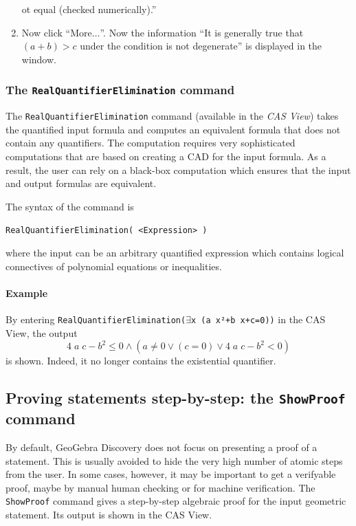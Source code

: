 \documentclass{article}
\begin{document}
\begin{enumerate}
ot equal (checked numerically).''
    \item Now click ``More$\ldots$''. Now the information ``It is generally true that $(a+b)>c$ under the condition is not degenerate'' is displayed in the window.
\end{enumerate}

\subsubsection{The \texttt{RealQuantifierElimination} command}

The \texttt{RealQuantifierElimination} command (available in the \textit{CAS View}) takes the quantified input formula and computes an equivalent formula that does not contain any quantifiers. The computation requires very sophisticated computations that are based on creating a CAD for the input formula. As a result, the user can rely on a black-box computation which ensures that the input and output formulas are equivalent.

The syntax of the command is
\begin{center}
    \texttt{RealQuantifierElimination( <Expression> )}
\end{center}
where the input can be an arbitrary quantified expression which contains logical connectives of polynomial equations or inequalities.

\paragraph{Example} By entering \texttt{RealQuantifierElimination($\exists$x (a x²+b x+c=0))} in the CAS View,
the output
\[4 \; a \; c - b^{2} \leq 0 \wedge \left(a \neq 0 \vee \left(c = 0 \right) \vee 4 \; a \; c - b^{2} < 0 \right)\]
is shown. Indeed, it no longer contains the existential quantifier.

\subsection{Proving statements step-by-step: the \texttt{ShowProof} command}

By default, GeoGebra Discovery does not focus on presenting a proof of a statement. This is usually avoided
to hide the very high number of atomic steps from the user. In some cases, however, it may be important to get a verifyable proof, maybe by manual human checking or for machine verification. The \texttt{ShowProof} command gives a step-by-step algebraic proof for the input geometric statement. Its output is shown in the CAS View.
\end{document}
